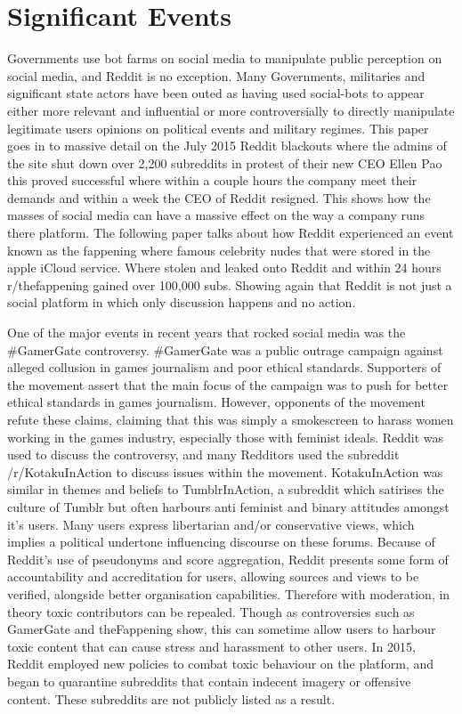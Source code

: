 \section{Significant Events}
Governments use bot farms on social media to manipulate public perception on social media, and Reddit is no exception. Many Governments, militaries and significant state actors have been outed as having used social-bots to appear either more relevant and influential or more controversially to directly manipulate legitimate users opinions on political events and military regimes. \cite{5} This paper \cite{14} goes in to massive detail on the July 2015 Reddit blackouts where the admins of the site shut down over 2,200 subreddits in protest of their new CEO Ellen Pao this proved successful where within a couple hours the company meet their demands and within a week the CEO of Reddit resigned. This shows how the masses of social media can have a massive effect on the way a company runs there platform. The following paper \cite{16} talks about how Reddit experienced an event known as the fappening where famous celebrity nudes that were stored in the apple iCloud service. Where stolen and leaked onto Reddit and within 24 hours r/thefappening gained over 100,000 subs. Showing again that Reddit is not just a social platform in which only discussion happens and no action.

One of the major events in recent years that rocked social media was the \#GamerGate controversy. \#GamerGate was a public outrage campaign against alleged collusion in games journalism and poor ethical standards. Supporters of the movement assert that the main focus of the campaign was to push for better ethical standards in games journalism. However, opponents of the movement refute these claims, claiming that this was simply a smokescreen to harass women working in the games industry, especially those with feminist ideals. Reddit was used to discuss the controversy, and many Redditors used the subreddit /r/KotakuInAction to discuss issues within the movement. KotakuInAction was similar in themes and beliefs to TumblrInAction, a subreddit which satirises the culture of Tumblr but often harbours anti feminist and binary attitudes amongst it’s users. Many users express libertarian and/or conservative views, which implies a political undertone influencing discourse on these forums. Because of Reddit’s use of pseudonyms and score aggregation, Reddit presents some form of accountability and accreditation for users, allowing sources and views to be verified, alongside better organisation capabilities. Therefore with moderation, in theory toxic contributors can be repealed. Though as controversies such as GamerGate and theFappening show, this can sometime allow users to harbour toxic content that can cause stress and harassment to other users. In 2015, Reddit employed new policies to combat toxic behaviour on the platform, and began to quarantine subreddits that contain indecent imagery or offensive content. These subreddits are not publicly listed as a result.\cite{15} 


